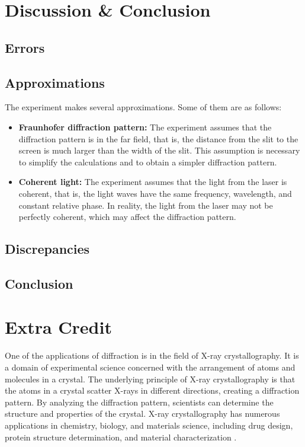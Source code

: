 \documentclass[10pt]{article}
\begin{document}
\section{Discussion \& Conclusion}

\subsection*{Errors}

\subsection*{Approximations}

The experiment makes several approximations. Some of them are as follows:

\begin{itemize}
  \item \textbf{Fraunhofer diffraction pattern:} The experiment assumes that the diffraction pattern is in the far field, that is, the distance from the slit to the screen is much larger than the width of the slit. This assumption is necessary to simplify the calculations and to obtain a simpler diffraction pattern. 
  \item \textbf{Coherent light:} The experiment assumes that the light from the laser is coherent, that is, the light waves have the same frequency, wavelength, and constant relative phase. In reality, the light from the laser may not be perfectly coherent, which may affect the diffraction pattern.
\end{itemize}

\subsection*{Discrepancies}

\subsection*{Conclusion} 

\section{Extra Credit}

One of the applications of diffraction is in the field of X-ray crystallography. It is a domain of experimental science concerned with the arrangement of atoms and molecules in a crystal. The underlying principle of X-ray crystallography is that the atoms in a crystal scatter X-rays in different directions, creating a diffraction pattern. By analyzing the diffraction pattern, scientists can determine the structure and properties of the crystal. X-ray crystallography has numerous applications in chemistry, biology, and materials science, including drug design, protein structure determination, and material characterization \cite{Carvalho_2009}.
\end{document}
